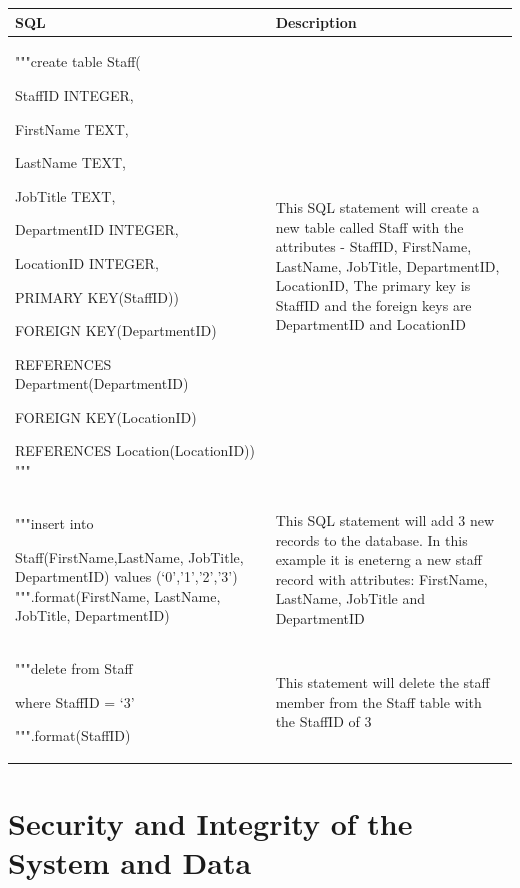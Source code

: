 \begin{center}
\begin{tabular}{|p{6cm}|p{5cm}|}
\hline
\textbf{SQL}      & \textbf{Description} \\ \hline
"""create table Staff(\

   StaffID INTEGER,\

   FirstName TEXT,\

   LastName TEXT,\

   JobTitle TEXT,\

   DepartmentID INTEGER,\

   LocationID INTEGER,\

   PRIMARY KEY(StaffID))\

   FOREIGN KEY(DepartmentID) \

   REFERENCES Department(DepartmentID)\

   FOREIGN KEY(LocationID) \

   REFERENCES Location(LocationID)) """                         & This SQL statement will create a new table called Staff with the attributes - StaffID, FirstName, LastName, JobTitle, DepartmentID, LocationID, The primary key is StaffID and the foreign keys are DepartmentID and LocationID                       \\ \hline

"""insert into\

Staff(FirstName,LastName, JobTitle, DepartmentID) values
(‘{0}’,’{1}’,’{2}’,'{3}')
""".format(FirstName, LastName, JobTitle, DepartmentID) & This SQL statement will add 3 new records to the database. In this example it is eneterng a new staff record with attributes: FirstName, LastName, JobTitle and DepartmentID \\ \hline

"""delete from Staff\

where StaffID = ‘{3}’\

""".format(StaffID) & This statement will delete the staff member from the Staff table with the StaffID of {3} \\ \hline

\end{tabular}
\end{center}

\newpage

\section{Security and Integrity of the System and Data}

